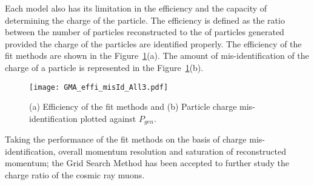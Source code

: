 Each model also has its limitation in the efficiency and the capacity of
determining the charge of the particle. The efficiency is defined as
the ratio between the number of particles reconstructed to the of
particles generated provided the charge of the particles are identified
properly. The efficiency of the fit methods are shown in the
Figure~\ref{fig:miseffi}(a).
The amount of mis-identification of the charge of a particle
is represented in the Figure~\ref{fig:miseffi}(b).
\begin{figure}[h]
  \centering
  \texttt{[image: GMA\_effi\_misId\_All3.pdf]}
  \caption{(a) Efficiency of the fit methods and (b) Particle charge
    mis-identification plotted against $P_{gen}$.}
  \label{fig:miseffi}
\end{figure}


Taking the performance of the fit methods on the basis of charge
mis-identification, overall momentum resolution and saturation of
reconstructed momentum; the Grid Search Method has been
accepted to further study the charge ratio of the cosmic ray muons.

